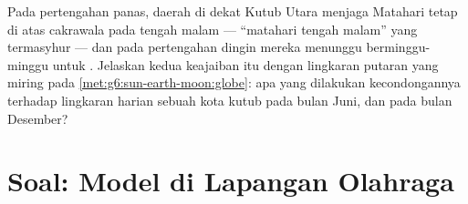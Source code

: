 \begin{exercise}[$\star\star\star$]\label{exo:g6:sun-earth-moon:12}
Pada pertengahan  panas, daerah di dekat Kutub Utara menjaga
Matahari tetap di atas cakrawala pada tengah malam --- ``matahari
tengah malam'' yang termasyhur --- dan pada pertengahan  dingin
mereka menunggu berminggu-minggu untuk . Jelaskan
kedua keajaiban itu dengan lingkaran putaran yang miring pada
\cref{met:g6:sun-earth-moon:globe}: apa yang dilakukan kecondongannya
terhadap lingkaran harian sebuah kota kutub pada bulan Juni, dan pada
bulan Desember?
\end{exercise}

\section{Soal: Model di Lapangan Olahraga}

